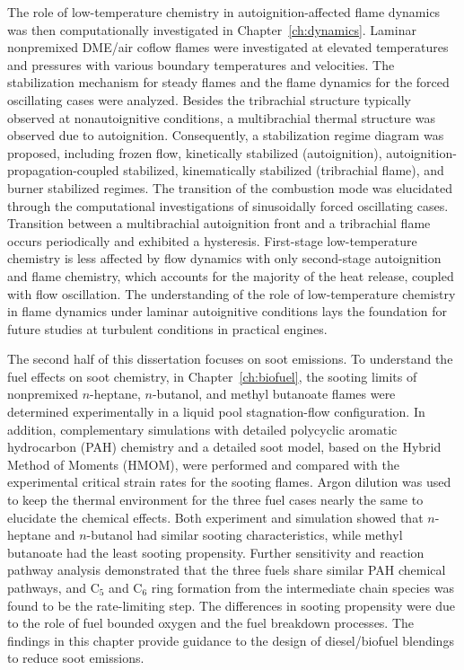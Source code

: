 {The role of low-temperature chemistry in autoignition-affected flame dynamics was then computationally investigated in Chapter~\ref{ch:dynamics}.  Laminar nonpremixed DME/air coflow flames were investigated at elevated temperatures and pressures with various boundary temperatures and velocities.  The stabilization mechanism for steady flames and the flame dynamics for the forced oscillating cases were analyzed.  Besides the tribrachial structure typically observed at nonautoignitive conditions, a multibrachial thermal structure was observed due to autoignition.  Consequently, a stabilization regime diagram was proposed, including frozen flow, kinetically stabilized (autoignition), autoignition-propagation-coupled stabilized, kinematically stabilized (tribrachial flame), and burner stabilized regimes.  The transition of the combustion mode was elucidated through the computational investigations of sinusoidally forced oscillating cases.  Transition between a multibrachial autoignition front and a tribrachial flame occurs periodically and exhibited a hysteresis.  First-stage low-temperature chemistry is less affected by flow dynamics with only second-stage autoignition and flame chemistry, which accounts for the majority of the heat release, coupled with flow oscillation.  The understanding of the role of low-temperature chemistry in flame dynamics under laminar autoignitive conditions lays the foundation for future studies at turbulent conditions in practical engines. 

The second half of this dissertation focuses on soot emissions.  To understand the fuel effects on soot chemistry, in Chapter~\ref{ch:biofuel}, the sooting limits of nonpremixed $n$-heptane, $n$-butanol, and methyl butanoate flames were determined experimentally in a liquid pool stagnation-flow configuration.  In addition, complementary simulations with detailed polycyclic aromatic hydrocarbon (PAH) chemistry and a detailed soot model, based on the Hybrid Method of Moments (HMOM), were performed and compared with the experimental critical strain rates for the sooting flames.  Argon dilution was used to keep the thermal environment for the three fuel cases nearly the same to elucidate the chemical effects.  Both experiment and simulation showed that $n$-heptane and $n$-butanol had similar sooting characteristics, while methyl butanoate had the least sooting propensity.  Further sensitivity and reaction pathway analysis demonstrated that the three fuels share similar PAH chemical pathways, and C$_5$ and C$_6$ ring formation from the intermediate chain species was found to be the rate-limiting step.  The differences in sooting propensity were due to the role of fuel bounded oxygen and the fuel breakdown processes.  The findings in this chapter provide guidance to the design of diesel/biofuel blendings to reduce soot emissions.

}
